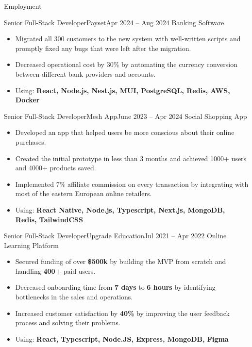 \documentclass[]{mcdowellcv}
\begin{document}
	\makeheader
	
	\begin{cvsection}{Employment}
		\begin{cvsubsection}{Senior Full-Stack Developer}{Payset}{Apr 2024 -- Aug 2024}
			Banking Software
			\begin{itemize}
				\item Migrated all 300 customers to the new system with well-written scripts and promptly fixed any bugs that were left after the migration.
				\item Decreased operational cost by 30\% by automating the currency conversion between different bank providers and accounts.
				\item Using: \textbf{React, Node.js, Nest.js, MUI, PostgreSQL, Redis, AWS, Docker}
			\end{itemize}
		\end{cvsubsection}

		\begin{cvsubsection}{Senior Full-Stack Developer}{Mesh App}{June 2023 -- Apr 2024}
			Social Shopping App
			\begin{itemize}
				\item Developed an app that helped users be more conscious about their online purchases.
				\item Created the initial prototype in less than 3 months and achieved 1000+ users and 4000+ products saved.
				\item Implemented 7\% affiliate commission on every transaction by integrating with most of the eastern European online retailers.
				\item Using: \textbf{React Native, Node.js, Typescript, Next.js, MongoDB, Redis, TailwindCSS}
			\end{itemize}
		\end{cvsubsection}

		\begin{cvsubsection}{Senior Full-Stack Developer}{Upgrade Education}{Jul 2021 -- Apr 2022}
			Online Learning Platform
			\begin{itemize}
				\item Secured funding of over \textbf{\$500k} by building the MVP from scratch and handling \textbf{400+} paid users.
				\item Decreased onboarding time from \textbf{7 days} to \textbf{6 hours} by identifying bottlenecks in the sales and operations.
				\item Increased customer satisfaction by \textbf{40\%} by improving the user feedback process and solving their problems.
				\item Using: \textbf{React, Typescript, Node.JS, Express, MongoDB, Figma}
			\end{itemize}
		\end{cvsubsection}


\end{cvsection}
\end{document}

